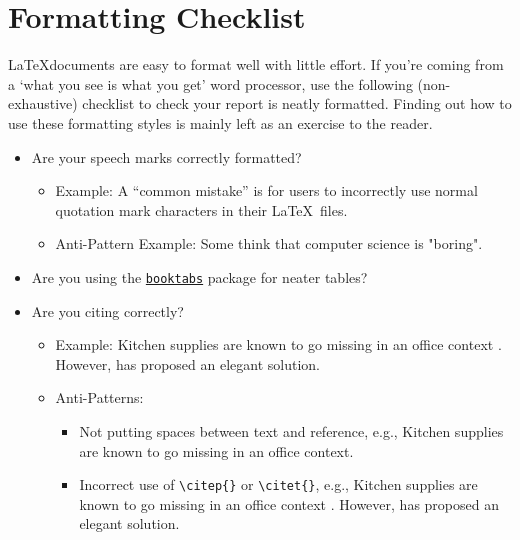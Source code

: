 \chapter{Formatting Checklist}

\LaTeX documents are easy to format well with little effort. If you're coming from a `what you see is what you get' word processor, use the following (non-exhaustive) checklist to check your report is neatly formatted. Finding out how to use these formatting styles is mainly left as an exercise to the reader.

\begin{itemize}
    \item Are your speech marks correctly formatted?  
    \begin{itemize}
        \item Example: A ``common mistake'' is for users to incorrectly use normal quotation mark characters in their \LaTeX\ files.
        \item Anti-Pattern Example: Some think that computer science is "boring".
    \end{itemize}

    \item Are you using the \href{https://nhigham.com/2019/11/19/better-latex-tables-with-booktabs/}{\texttt{booktabs}} package for neater tables?  

    \item Are you citing correctly?  
    \begin{itemize}
        \item Example: Kitchen supplies are known to go missing in an office context \citep{CaseOfDisappearingTeaspoons}. However,  \citet{TeaspoonSolutionProposal} has proposed an elegant solution.
        \item Anti-Patterns:
        \begin{itemize}
            \item Not putting spaces between text and reference, e.g., Kitchen supplies are known to go missing in an office context\citep{CaseOfDisappearingTeaspoons}.
            \item Incorrect use of \texttt{\textbackslash citep\{\}} or \texttt{\textbackslash citet\{\}}, e.g., Kitchen supplies are known to go missing in an office context \citet{CaseOfDisappearingTeaspoons}. However, \citep{TeaspoonSolutionProposal} has proposed an elegant solution.
        \end{itemize}
    \end{itemize}


\end{itemize}
